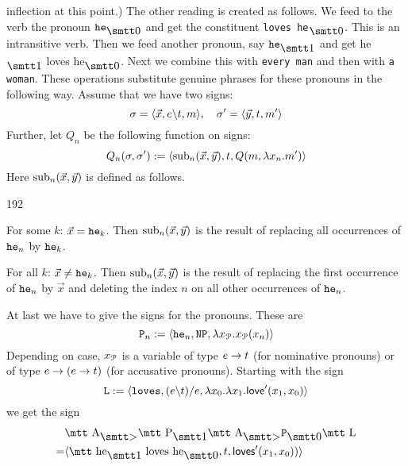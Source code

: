 inflection at this point.) The other reading is created as 
follows. We feed to the verb the pronoun $\mbox{\tt he}_{\snull}$ and 
get the constituent {\tt loves he$_{\snull}$}. This is an intransitive 
verb. Then we feed another pronoun, say $\mbox{\tt he}_{\seins}$ 
and get {\mtt he$_{\seins}$ loves he$_{\snull}$}. Next we combine this 
with {\tt every man} and then with {\tt a woman}. These operations 
substitute genuine phrases for these pronouns in the following 
way.  Assume that we have two signs:
\begin{equation}
\sigma = \langle \vec{x}, e \backslash t, m\rangle, \quad
    \sigma' = \langle \vec{y}, t, m'\rangle 
\end{equation}
Further, let $Q_n$ be the following function on signs:
\begin{equation}
Q_n(\sigma, \sigma') := \langle \operatorname{sub}_n(\vec{x},\vec{y}),
    t, Q(m,\lambda x_n.m')\rangle
\end{equation}
Here $\operatorname{sub}_n(\vec{x},\vec{y})$ is defined as follows.
\begin{dingautolist}{192}
\item
For some $k$: $\vec{x} = \mbox{\tt he}_k$. Then $\operatorname{sub}_n(\vec{x},\vec{y})$
    is the result of replacing all occurrences of
    $\mbox{\tt he}_n$ by $\mbox{\tt he}_k$.
\item
For all $k$: $\vec{x} \neq \mbox{\tt he}_k$. Then $\operatorname{sub}_n(\vec{x}, \vec{y})$
    is the result of replacing the first occurrence of
    $\mbox{\tt he}_n$ by $\vec{x}$ and deleting the index
    $n$ on all other occurrences of $\mbox{\tt he}_n$.
\end{dingautolist}
At last we have to give the signs for the pronouns. These are
\begin{equation}
\mbox{\tt P}_n := \langle \mbox{\tt he}_n, \mbox{\tt NP}, \lambda
    x_{\mathcal{P}}.x_{\mathcal{P}}(x_n)\rangle
\end{equation}
Depending on case, $x_{\mathcal{P}}$ is a variable of type $e \rightarrow t$
(for nominative pronouns) or of type $e \rightarrow (e \rightarrow t)$ (for
accusative pronouns). Starting with the sign
\begin{equation}
\mbox{\tt L} := \langle \mbox{\tt loves}, (e\backslash t)/e,
    \lambda x_0. \lambda x_1.
    \mbox{\sf love}'(x_1, x_0)\rangle 
\end{equation}
we get the sign
\begin{align}
& \mbox{\mtt A}_{\sgr}\mbox{\mtt P}_{\seins}\mbox{\mtt A}_{\sgr}%
\mbox{\tt P}_{\snull}\mbox{\mtt L}  \\\notag
= & 
\auf \mbox{\mtt he$_{\seins}$ loves he$_{\snull}$}, t,
    \mbox{\sf loves}'(x_1,x_0))\zu
\end{align}

